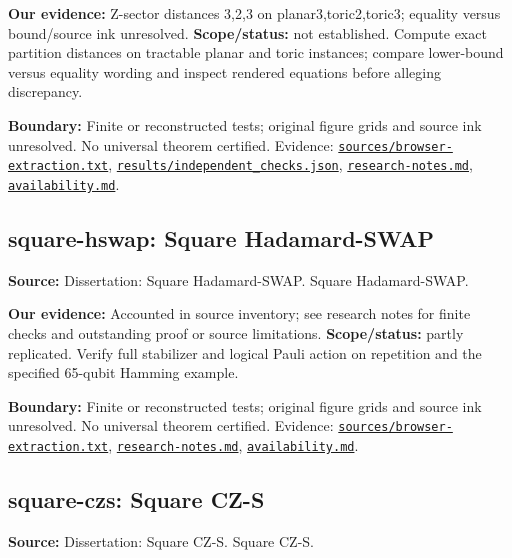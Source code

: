 \documentclass[11pt]{article}
\begin{document}
\textbf{Our evidence:} Z-sector distances 3,2,3 on planar3,toric2,toric3; equality versus bound/source ink unresolved. \textbf{Scope/status:} not established. Compute exact partition distances on tractable planar and toric instances; compare lower-bound versus equality wording and inspect rendered equations before alleging discrepancy.

\textbf{Boundary:} Finite or reconstructed tests; original figure grids and source ink unresolved. No universal theorem certified. Evidence: \href{https://github.com/alectionary/vibe-math/blob/master/formalization/quintavalle-hgp/sources/browser-extraction.txt}{\nolinkurl{sources/browser-extraction.txt}}, \href{https://github.com/alectionary/vibe-math/blob/master/formalization/quintavalle-hgp/results/independent_checks.json}{\nolinkurl{results/independent_checks.json}}, \href{https://github.com/alectionary/vibe-math/blob/master/formalization/quintavalle-hgp/research-notes.md}{\nolinkurl{research-notes.md}}, \href{https://github.com/alectionary/vibe-math/blob/master/formalization/quintavalle-hgp/availability.md}{\nolinkurl{availability.md}}.
\subsection{square-hswap: Square Hadamard-SWAP}
\label{claim:square-hswap}
\textbf{Source:} Dissertation: Square Hadamard-SWAP. Square Hadamard-SWAP.

\textbf{Our evidence:} Accounted in source inventory; see research notes for finite checks and outstanding proof or source limitations. \textbf{Scope/status:} partly replicated. Verify full stabilizer and logical Pauli action on repetition and the specified 65-qubit Hamming example.

\textbf{Boundary:} Finite or reconstructed tests; original figure grids and source ink unresolved. No universal theorem certified. Evidence: \href{https://github.com/alectionary/vibe-math/blob/master/formalization/quintavalle-hgp/sources/browser-extraction.txt}{\nolinkurl{sources/browser-extraction.txt}}, \href{https://github.com/alectionary/vibe-math/blob/master/formalization/quintavalle-hgp/research-notes.md}{\nolinkurl{research-notes.md}}, \href{https://github.com/alectionary/vibe-math/blob/master/formalization/quintavalle-hgp/availability.md}{\nolinkurl{availability.md}}.
\subsection{square-czs: Square CZ-S}
\label{claim:square-czs}
\textbf{Source:} Dissertation: Square CZ-S. Square CZ-S.
\end{document}
